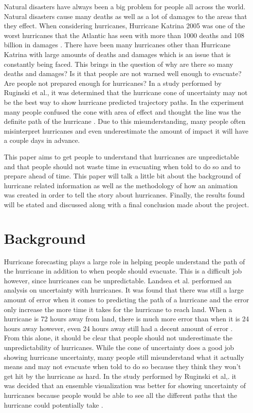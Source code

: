 
Natural disasters have always been a big problem for people all across the world. Natural disasters cause many deaths as well as a lot of damages to the areas that they effect. When considering hurricanes, Hurricane Katrina 2005 was one of the worst hurricanes that the Atlantic has seen with more than 1000 deaths and 108 billion in damages \cite{blake2011deadliest}. There have been many hurricanes other than Hurricane Katrina with large amounts of deaths and damages which is an issue that is constantly being faced. This brings in the question of why are there so many deaths and damages? Is it that people are not warned well enough to evacuate? Are people not prepared enough for hurricanes? In a study performed by Ruginski et al., it was determined that the hurricane cone of uncertainty may not be the best way to show hurricane predicted trajectory paths. In the experiment many people confused the cone with area of effect and thought the line was the definite path of the hurricane \cite{ruginski2016non}. Due to this misunderstanding, many people often misinterpret hurricanes and even underestimate the amount of impact it will have a couple days in advance. 

This paper aims to get people to understand that hurricanes are unpredictable and that people should not waste time in evacuating when told to do so and to prepare ahead of time. This paper will talk a little bit about the background of hurricane related information as well as the methodology of how an animation was created in order to tell the story about hurricanes. Finally, the results found will be stated and discussed along with a final conclusion made about the project.

\section{Background}

Hurricane forecasting plays a large role in helping people understand the path of the hurricane in addition to when people should evacuate. This is a difficult job however, since hurricanes can be unpredictable. Landsea et al. performed an analysis on uncertainty with hurricanes. It was found that there was still a large amount of error when it comes to predicting the path of a hurricane and the error only increase the more time it takes for the hurricane to reach land. When a hurricane is 72 hours away from land, there is much more error than when it is 24 hours away however, even 24 hours away still had a decent amount of error \cite{landsea2013atlantic}. From this alone, it should be clear that people should not underestimate the unpredictability of hurricanes. While the cone of uncertainty does a good job showing hurricane uncertainty, many people still misunderstand what it actually means and may not evacuate when told to do so because they think they won't get hit by the hurricane as hard. In the study performed by Ruginski et al,. it was decided that an ensemble visualization was better for showing uncertainty of hurricanes because people would be able to see all the different paths that the hurricane could potentially take \cite{ruginski2016non}.

